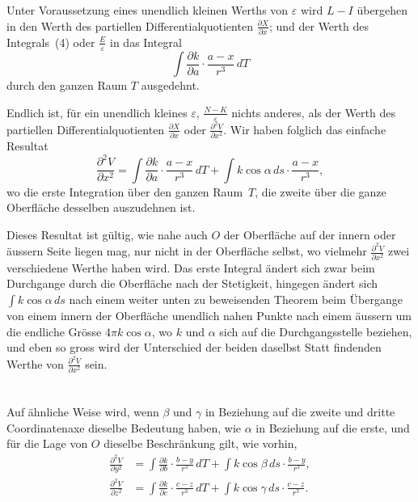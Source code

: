\documentclass[12pt,a4paper]{article}
\begin{document}
Unter Voraussetzung eines unendlich kleinen Werths von $\varepsilon$ wird $L-I$
übergehen in den Werth des partiellen Differentialquotienten $\tfrac{\partial X}{\partial x}$; und der Werth
des Integrals~(4) oder $\tfrac{E}{\varepsilon}$ in das Integral
\[
\int\frac{\partial k}{\partial a}\cdot\frac{a-x}{r^3}\,dT
\]
durch den ganzen Raum $T$ ausgedehnt.

Endlich ist, für ein unendlich kleines $\varepsilon$, $\tfrac{N-K}{\varepsilon}$ nichts anderes, als der Werth
des partiellen Differentialquotienten $\tfrac{\partial X}{\partial x}$ oder $\tfrac{\partial^2 V}{\partial x^2}$. Wir haben folglich das einfache Resultat
\[
\frac{\partial^2 V}{\partial x^2} = \int\frac{\partial k}{\partial a}\cdot\frac{a-x}{r^3}\,dT
                       + \int k\cos\alpha\,ds\cdot\frac{a-x}{r^3},
\]
wo die erste Integration über den ganzen Raum~$T$, die zweite über die ganze Oberfläche desselben auszudehnen ist.

Dieses Resultat ist gültig, wie nahe auch $O$ der Oberfläche auf der innern
oder äussern Seite liegen mag, nur nicht in der Oberfläche selbst, wo vielmehr
$\tfrac{\partial^2 V}{\partial x^2}$ zwei verschiedene Werthe haben wird. Das erste Integral ändert sich zwar
beim Durchgange durch die Oberfläche nach der Stetigkeit, hingegen ändert sich
$\int k\cos\alpha\,ds$ nach einem weiter unten zu beweisenden Theorem beim Übergange
von einem innern der Oberfläche unendlich nahen Punkte nach einem äussern
um die endliche Grösse $4\pi k\cos\alpha$, wo $k$ und $\alpha$ sich auf die Durchgangsstelle beziehen,
und eben so gross wird der Unterschied der beiden daselbst Statt findenden Werthe
von $\tfrac{\partial^2 V}{\partial x^2}$ sein.

\section{}
Auf ähnliche Weise wird, wenn $\beta$ und $\gamma$ in Beziehung auf die zweite und
dritte Coordinatenaxe dieselbe Bedeutung haben, wie $\alpha$ in Beziehung auf die
erste, und für die Lage von $O$ dieselbe Beschränkung gilt, wie vorhin,
\begin{align*}
\frac{\partial^2 V}{\partial y^2} &= \int\frac{\partial k}{\partial b}\cdot\frac{b-y}{r^3}\,dT
                       + \int k\cos\beta\,ds\cdot\frac{b-y}{r^3},\\
\frac{\partial^2 V}{\partial z^2} &= \int\frac{\partial k}{\partial c}\cdot\frac{c-z}{r^3}\,dT
                       + \int k\cos\gamma\,ds\cdot\frac{c-z}{r^3}.
\end{align*}
\end{document}
